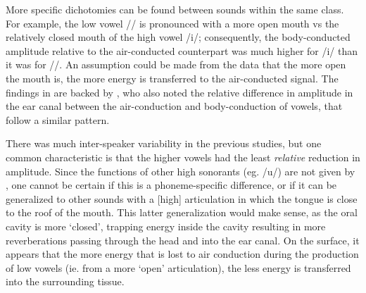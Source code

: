 
More specific dichotomies can be found between sounds within the same class. For example, the low vowel // is pronounced with a more open mouth vs the relatively closed mouth of the high vowel /i/; consequently, the body-conducted amplitude relative to the air-conducted counterpart was much higher for /i/ than it was for //. An assumption could be made from the data that the more open the mouth is, the more energy is transferred to the air-conducted signal.%
The findings in \cite{reinfeldt:10} are backed by \cite{bekesy:60}, who also noted %
the relative difference in amplitude in the ear canal between the air-conduction and body-conduction of vowels, %
that follow a similar pattern.  

There was much inter-speaker variability in the previous studies, but one common characteristic is that the higher vowels had the least \textit{relative} reduction in amplitude.  Since the functions of other high sonorants (eg. /u/) are not given by \cite{reinfeldt:10}, one cannot be certain if this is a phoneme-specific difference, or if it can be generalized to other sounds with a [high] articulation in which the tongue is close to the roof of the mouth.  This latter generalization would make sense, as the oral cavity is more `closed', trapping energy inside the cavity resulting in more reverberations passing through the head and into the ear canal.
%
%
On the surface, it appears that the more energy that is lost to air conduction during the production of low vowels (ie. from a more `open' articulation), the less energy is transferred into the surrounding tissue.

